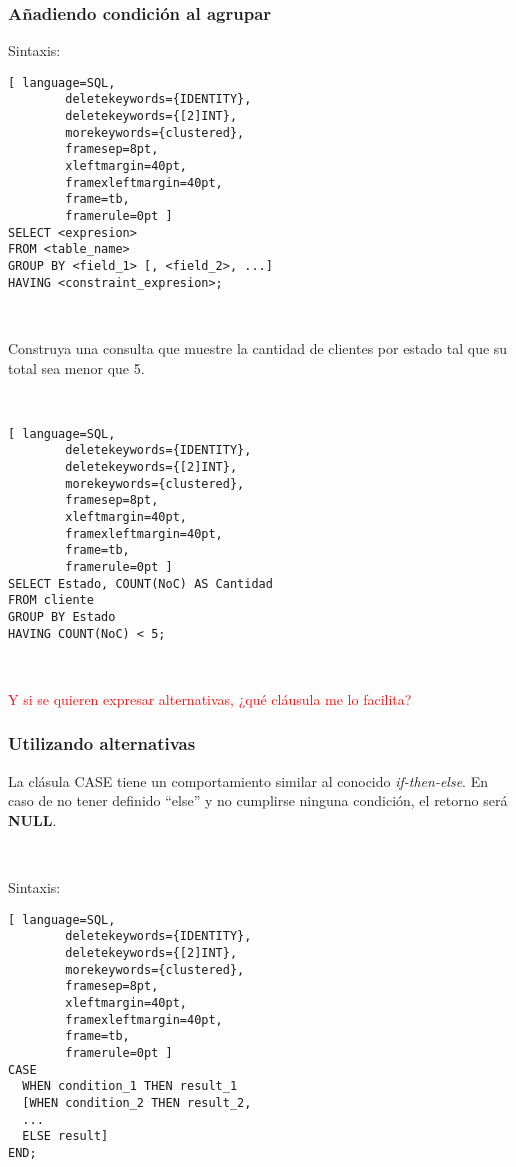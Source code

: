 \begin{frame}[fragile]

	\frametitle{Añadiendo condición al agrupar}

	Sintaxis:
	\begin{lstlisting}[ language=SQL,
		deletekeywords={IDENTITY},
		deletekeywords={[2]INT},
		morekeywords={clustered},
		framesep=8pt,
		xleftmargin=40pt,
		framexleftmargin=40pt,
		frame=tb,
		framerule=0pt ]
SELECT <expresion>
FROM <table_name>
GROUP BY <field_1> [, <field_2>, ...]
HAVING <constraint_expresion>;
\end{lstlisting}

	\pause 

	\ 

	Construya una consulta que muestre la cantidad de clientes por estado tal que su total sea menor que 5. 

	\  

	\pause 

	\begin{lstlisting}[ language=SQL,
		deletekeywords={IDENTITY},
		deletekeywords={[2]INT},
		morekeywords={clustered},
		framesep=8pt,
		xleftmargin=40pt,
		framexleftmargin=40pt,
		frame=tb,
		framerule=0pt ]
SELECT Estado, COUNT(NoC) AS Cantidad
FROM cliente 
GROUP BY Estado
HAVING COUNT(NoC) < 5;
\end{lstlisting}

	\pause
	
	\ 
	
	\textcolor{red}{Y si se quieren expresar alternativas, ¿qué cláusula me lo facilita?}

\end{frame}


\begin{frame}[fragile]
	
	\frametitle{Utilizando alternativas}
	
	La clásula  \textcolor{codepurple}{CASE} tiene un comportamiento similar al conocido \emph{if-then-else}. En caso de no tener definido ``else'' y no cumplirse ninguna condición, el retorno será \textbf{NULL}.
	
	\ 
	
	Sintaxis: 
	
	\begin{lstlisting}[ language=SQL,
		deletekeywords={IDENTITY},
		deletekeywords={[2]INT},
		morekeywords={clustered},
		framesep=8pt,
		xleftmargin=40pt,
		framexleftmargin=40pt,
		frame=tb,
		framerule=0pt ]
CASE
  WHEN condition_1 THEN result_1
  [WHEN condition_2 THEN result_2, 
  ...
  ELSE result]
END;
\end{lstlisting}
	
	
\end{frame}

